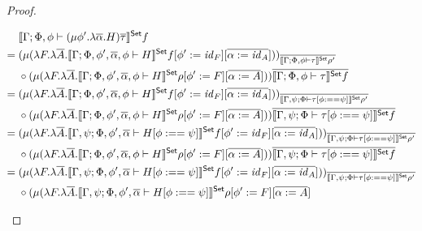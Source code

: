 \documentclass[acmsmall,review,anonymous]{acmart}
\theoremstyle{definition}
\newcommand{\set}{\mathsf{Set}}
\renewcommand{\id}{\mathit{id}}
\begin{document}
\begin{proof}
\begin{itemize}
      \begin{align*}
        & \setsem{\Gamma; \Phi, \phi \vdash (\mu \phi'. \lambda \ol\alpha. H)\ol\tau } f \\
        = \; & 
           (\mu (
             \lambda F. \lambda \ol{A}. \setsem{\Gamma; \Phi, \phi', \ol{\alpha}, \phi \vdash H} f [\phi' := \id_F][\ol{\alpha := \id_A}]
           ))_{\ol{\setsem{\Gamma; \Phi, \phi \vdash \tau} \rho'}} \\
          \; & \circ
          (\mu (
            \lambda F. \lambda \ol{A}. \setsem{\Gamma; \Phi, \phi', \ol{\alpha}, \phi \vdash H} \rho[\phi' := F][\ol{\alpha := A}]
          )
        ) \ol{\setsem{ \Gamma; \Phi, \phi \vdash \tau} f} \\
        = \; & 
           (\mu (
             \lambda F. \lambda \ol{A}. \setsem{\Gamma; \Phi, \phi', \ol{\alpha}, \phi \vdash H} f [\phi' := \id_F][\ol{\alpha := \id_A}]
           ))_{\ol{\setsem{\Gamma, \psi; \Phi \vdash \tau[\phi :== \psi]} \rho'}} \\
          \; & \circ
          (\mu (
            \lambda F. \lambda \ol{A}. \setsem{\Gamma; \Phi, \phi', \ol{\alpha}, \phi \vdash H} \rho[\phi' := F][\ol{\alpha := A}]
          )
        ) \ol{\setsem{ \Gamma, \psi; \Phi \vdash \tau[\phi :== \psi]} f} \\
        = \; & 
           (\mu (
              \lambda F. \lambda \ol{A}. \setsem{\Gamma, \psi; \Phi, \phi', \ol{\alpha} \vdash H[\phi :== \psi]} f [\phi' := \id_F][\ol{\alpha := \id_A}]
           ))_{\ol{\setsem{\Gamma, \psi; \Phi \vdash \tau[\phi :== \psi]} \rho'}} \\
          \; & \circ
          (\mu (
            \lambda F. \lambda \ol{A}. \setsem{\Gamma; \Phi, \phi', \ol{\alpha}, \phi \vdash H} \rho[\phi' := F][\ol{\alpha := A}]
          )
        ) \ol{\setsem{ \Gamma, \psi; \Phi \vdash \tau[\phi :== \psi]} f} \\
        = \; & 
           (\mu (
              \lambda F. \lambda \ol{A}. \setsem{\Gamma, \psi; \Phi, \phi', \ol{\alpha} \vdash H[\phi :== \psi]} f [\phi' := \id_F][\ol{\alpha := \id_A}]
           ))_{\ol{\setsem{\Gamma, \psi; \Phi \vdash \tau[\phi :== \psi]} \rho'}} \\
          \; & \circ
          (\mu (
            \lambda F. \lambda \ol{A}. \setsem{\Gamma, \psi; \Phi, \phi', \ol{\alpha} \vdash H[\phi :== \psi]} \rho[\phi' := F][\ol{\alpha := A}]

\end{align*}
\end{itemize}
\end{proof}
\end{document}
